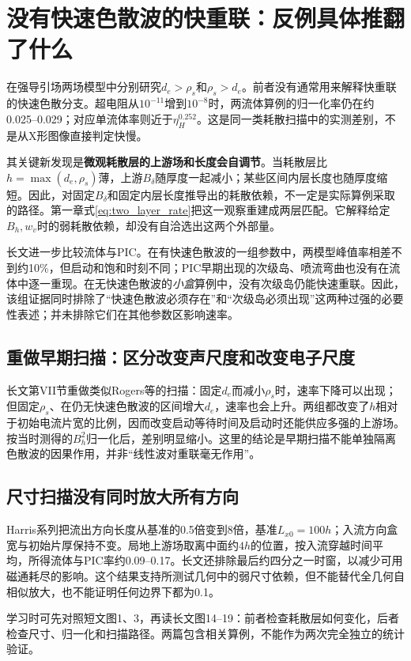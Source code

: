 \section{没有快速色散波的快重联：反例具体推翻了什么}\label{sec:withoutfdw}
\citet{L216}在强导引场两场模型中分别研究$d_e>\rho_s$和$\rho_s>d_e$。前者没有通常用来解释快重联的快速色散分支。超电阻从$10^{-11}$增到$10^{-8}$时，两流体算例的归一化率仍在约0.025--0.029；对应单流体率则近于$\eta_H^{0.252}$。这是同一类耗散扫描中的实测差别，不是从X形图像直接判定快慢。

其关键新发现是\textbf{微观耗散层的上游场和长度会自调节}。当耗散层比$h=\max(d_e,\rho_s)$薄，上游$B_\delta$随厚度一起减小；某些区间内层长度也随厚度缩短。因此，对固定$B_\delta$和固定内层长度推导出的耗散依赖，不一定是实际算例采取的路径。第一章式\eqref{eq:two_layer_rate}把这一观察重建成两层匹配。它解释给定$B_h,w_v$时的弱耗散依赖，却没有自洽选出这两个外部量。

长文\citet{L217}进一步比较流体与PIC。在有快速色散波的一组参数中，两模型峰值率相差不到约10\%，但启动和饱和时刻不同；PIC早期出现的次级岛、喷流弯曲也没有在流体中逐一重现。在无快速色散波的\emph{小盒}算例中，没有次级岛仍能快速重联。因此，该组证据同时排除了“快速色散波必须存在”和“次级岛必须出现”这两种过强的必要性表述；并未排除它们在其他参数区影响速率。

\subsection{重做早期扫描：区分改变声尺度和改变电子尺度}
长文第VII节重做类似Rogers等的扫描：固定$d_e$而减小$\rho_s$时，速率下降可以出现；但固定$\rho_s$、在仍无快速色散波的区间增大$d_e$，速率也会上升。两组都改变了$h$相对于初始电流片宽的比例，因而改变启动等待时间及启动时还能供应多强的上游场。按当时测得的$B_h^2$归一化后，差别明显缩小。这里的结论是早期扫描不能单独隔离色散波的因果作用，并非“线性波对重联毫无作用”。\citep{Rogers2001,L217}

\subsection{尺寸扫描没有同时放大所有方向}
Harris系列把流出方向长度从基准的0.5倍变到8倍，基准$L_{x0}=100h$；入流方向盒宽与初始片厚保持不变。局地上游场取离中面约$4h$的位置，按入流穿越时间平均，所得流体与PIC率约0.09--0.17。长文还排除最后约四分之一时窗，以减少可用磁通耗尽的影响。这个结果支持所测试几何中的弱尺寸依赖，但不能替代全几何自相似放大，也不能证明任何边界下都为0.1。

学习时可先对照短文图1、3，再读长文图14--19：前者检查耗散层如何变化，后者检查尺寸、归一化和扫描路径。两篇包含相关算例，不能作为两次完全独立的统计验证。\citep{L216,L217}

